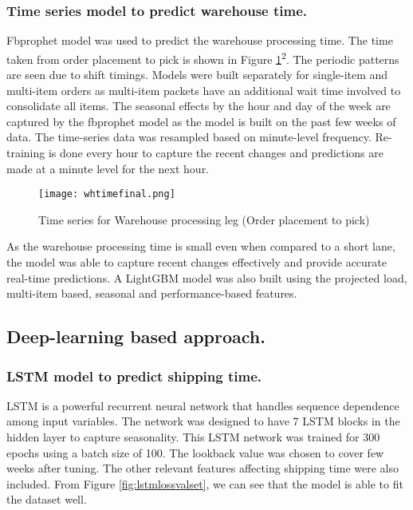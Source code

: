 \documentclass[twoside,leqno,twocolumn]{article}
\begin{document}
\subsubsection{Time series model to predict warehouse time.}
Fbprophet model was used to predict the warehouse processing time. The time taken from order placement to pick is shown in Figure \ref{fig:otop}\textsuperscript{2}. The periodic patterns are seen due to shift timings. Models were built separately for single-item and multi-item orders as multi-item packets have an additional wait time involved to consolidate all items. The seasonal effects by the hour and day of the week are captured by the fbprophet model as the model is built on the past few weeks of data. The time-series data was resampled based on minute-level frequency. Re-training is done every hour to capture the recent changes and predictions are made at a minute level for the next hour.

\begin{figure}[h]
\centering
    \texttt{[image: whtimefinal.png]}
\caption{Time series for Warehouse processing leg (Order placement to pick)}
    \label{fig:otop}
    \vspace{-2mm}
\end{figure}

As the warehouse processing time is small even when compared to a short lane, the model was able to capture recent changes effectively and provide accurate real-time predictions. A LightGBM model was also built using the projected load, multi-item based, seasonal and performance-based features.

\subsection{Deep-learning based approach.}
\subsubsection{LSTM model to predict shipping time.}
LSTM is a powerful recurrent neural network that handles sequence dependence among input variables. The network was designed to have 7 LSTM blocks in the hidden layer to capture seasonality. This LSTM network was trained for 300 epochs using a batch size of 100. The lookback value was chosen to cover few weeks after tuning. The other relevant features affecting shipping time were also included. From Figure \ref{fig:lstmlossvalset}, we can see that the model is able to fit the dataset well. 
\end{document}

